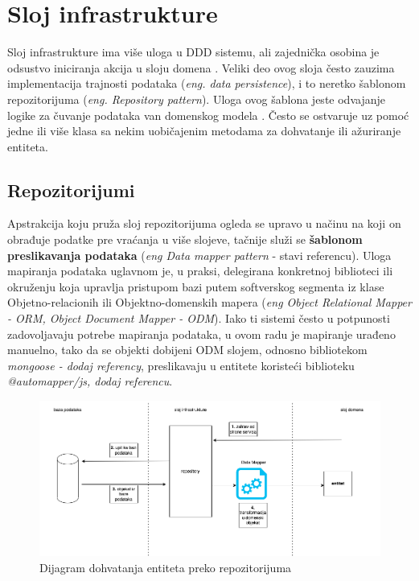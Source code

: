 \documentclass[12pt,oneside]{memoir}
\begin{document}
\section{Sloj infrastrukture}

Sloj infrastrukture ima više uloga u DDD sistemu, ali zajednička osobina je odsustvo iniciranja akcija u sloju domena \cite{dddfull}. Veliki deo ovog sloja često zauzima implementacija trajnosti podataka (\textit{eng. data persistence}), i to neretko šablonom repozitorijuma (\textit{eng. Repository pattern}). Uloga ovog šablona jeste odvajanje logike za čuvanje podataka van domenskog modela \cite{msrepository}. Često se ostvaruje uz pomoć jedne ili više klasa sa nekim uobičajenim metodama za dohvatanje ili ažuriranje entiteta.


\subsection{Repozitorijumi}
Apstrakcija koju pruža sloj repozitorijuma ogleda se upravo u načinu na koji on obrađuje podatke pre vraćanja u više slojeve, tačnije služi se \textbf{šablonom preslikavanja podataka} (\textit{eng Data mapper pattern} - stavi referencu). Uloga mapiranja podataka uglavnom je, u praksi, delegirana konkretnoj biblioteci ili okruženju koja upravlja pristupom bazi putem softverskog segmenta iz klase Objetno-relacionih ili Objektno-domenskih mapera (\textit{eng Object Relational Mapper - ORM, Object Document Mapper - ODM}). Iako ti sistemi često u potpunosti zadovoljavaju potrebe mapiranja podataka, u ovom radu je mapiranje urađeno manuelno, tako da se objekti dobijeni ODM slojem, odnosno bibliotekom \textit{mongoose - dodaj referency}, preslikavaju u entitete koristeći biblioteku \textit{@automapper/js, dodaj referencu}.

\begin{figure}[h]
  \centering
  \includegraphics[width=1\textwidth]{docs/images/ch_2/repository.png} 
  \caption{Dijagram dohvatanja entiteta preko repozitorijuma}
  \label{fig:sample}
\end{figure}
\end{document}
